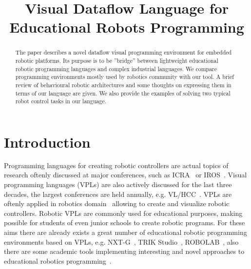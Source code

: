 \documentclass[conference,compsoc]{IEEEtran}
\begin{document}
\title{Visual Dataflow Language for Educational Robots Programming}

\author{
	\and

}

\maketitle



\begin{abstract}
The paper describes a novel dataflow visual programming environment for embedded robotic platforms. Its purpose is to be ''bridge'' between lightweight educational robotic programming languages and complex industrial languages. We compare programming environments mostly used by robotics community with our tool. A brief review of behavioural robotic architectures and some thoughts on expressing them in terms of our language are given. We also provide the examples of solving two typical robot control tasks in our language.
\end{abstract}

\section{Introduction}

Programming languages for creating robotic controllers are actual topics of research oftenly discussed at major conferences, such as ICRA~\cite{Icra} or IROS~\cite{Iros2016}. Visual programming languages (VPLs) are also actively discussed for the last three decades, the largest conferences are held annually, e.g. VL/HCC~\cite{VLHCC}. VPLs are oftenly applied in robotics domain~\cite{banyasad2000visual,simpson2006mobile,simpson2008visual,posso2011process,diprose2011ruru} allowing to create and visualize robotic controllers. Robotic VPLs are commonly used for educational purposes, making possible for students of even junior schools to create robotic programs. For these aims there are already exists a great number of educational robotic programming environments based on VPLs, e.g. NXT-G~\cite{nxtg}, TRIK Studio~\cite{trik}, ROBOLAB~\cite{robolab}, also there are some academic tools implementing interesting and novel approaches to educational robotics programming~\cite{banyasad2000visual,simpson2008visual,diprose2011ruru}.
\end{document}
